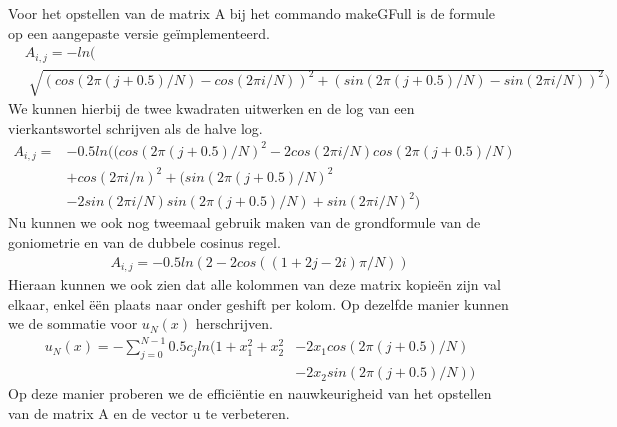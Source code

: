 \documentclass[a4paper]{article}
\begin{document}
Voor het opstellen van de matrix A bij het commando makeGFull is de formule op een aangepaste versie ge\"implementeerd.
\begin{equation}
\label{matA}
\begin{aligned}
	&A_{i,j} = -ln( \\ &\sqrt[]{(cos(2\pi (j+0.5)/N)-cos(2\pi i/N))^2
	 +(sin(2\pi (j+0.5)/N)-sin(2\pi i/N))^2})
\end{aligned}
\end{equation}
We kunnen hierbij de twee kwadraten uitwerken en de log van een vierkantswortel schrijven als de halve log.
\begin{equation}
\label{matAvoluit}
\begin{aligned}
	A_{i,j} = & -0.5ln((cos(2\pi (j+0.5)/N)^2-2cos(2\pi i/N)cos(2\pi (j+0.5)/N) \\ & + cos(2\pi i/n)^2
	 +(sin(2\pi (j+0.5)/N)^2 \\ & -2sin(2\pi i/N)sin(2\pi (j+0.5)/N)+sin(2\pi i/N)^2)
\end{aligned}
\end{equation}
Nu kunnen we ook nog tweemaal gebruik maken van de grondformule van de goniometrie en van de dubbele cosinus regel.
\begin{equation}
\label{matAkort}
\begin{aligned}
	A_{i,j} = -0.5ln(2 - 2cos((1+2j-2i)\pi/N))
\end{aligned}
\end{equation}
Hieraan kunnen we ook zien dat alle kolommen van deze matrix kopie\"en zijn val elkaar, enkel \"e\"en plaats naar onder geshift per kolom. Op dezelfde manier kunnen we de sommatie voor $u_N(x)$ herschrijven.
\begin{equation}
\label{un}
\begin{aligned}
	u_N(x) = -\sum_{j=0}^{N-1} 0.5c_jln(1+x_1^2+x_2^2 &-2x_1cos(2\pi (j+0.5)/N)\\&-2x_2sin(2\pi (j+0.5)/N))
\end{aligned}
\end{equation}
Op deze manier proberen we de effici\"entie en nauwkeurigheid van het opstellen van de matrix A en de vector u te verbeteren.
\end{document}
